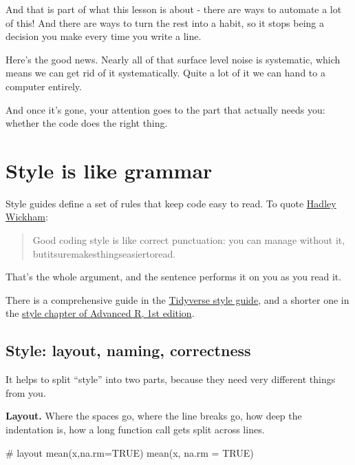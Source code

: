 \documentclass[
  letterpaper,
  justified,
  a4paper]{tufte-book}
\makeatletter
\newenvironment{Shaded}{\begin{snugshade}}{\end{snugshade}}
\newcommand{\AttributeTok}[1]{\textcolor[rgb]{0.40,0.45,0.13}{#1}}
\newcommand{\CommentTok}[1]{\textcolor[rgb]{0.37,0.37,0.37}{#1}}
\newcommand{\ConstantTok}[1]{\textcolor[rgb]{0.56,0.35,0.01}{#1}}
\newcommand{\FunctionTok}[1]{\textcolor[rgb]{0.28,0.35,0.67}{#1}}
\newcommand{\NormalTok}[1]{\textcolor[rgb]{0.00,0.23,0.31}{#1}}
\let\rbporigShaded\Shaded
\let\rbporigendShaded\endShaded
\renewenvironment{Shaded}{%
  \begingroup
  \ifdim\linewidth=\rbpbodywidth
    \advance\linewidth by \@tufte@overhang
    \advance\hsize by \@tufte@overhang
    \advance\columnwidth by \@tufte@overhang
  \fi
  \rbporigShaded
}{%
  \rbporigendShaded
  \endgroup
}
\makeatother
\begin{document}
And that is part of what this lesson is about - there are ways to
automate a lot of this! And there are ways to turn the rest into a
habit, so it stops being a decision you make every time you write a
line.

Here's the good news. Nearly all of that surface level noise is
systematic, which means we can get rid of it systematically. Quite a lot
of it we can hand to a computer entirely.

And once it's gone, your attention goes to the part that actually needs
you: whether the code does the right thing.

\section{Style is like grammar}\label{style-is-like-grammar}

Style guides define a set of rules that keep code easy to read. To quote
\href{https://hadley.nz/}{Hadley Wickham}:

\begin{quote}
Good coding style is like correct punctuation: you can manage without
it, butitsuremakesthingseasiertoread.
\end{quote}

That's the whole argument, and the sentence performs it on you as you
read it.

There is a comprehensive guide in the
\href{https://style.tidyverse.org/}{Tidyverse style guide}, and a
shorter one in the \href{http://adv-r.had.co.nz/Style.html}{style
chapter of Advanced R, 1st edition}.

\subsection{Style: layout, naming,
correctness}\label{style-layout-naming-correctness}

It helps to split ``style'' into two parts, because they need very
different things from you.

\textbf{Layout.} Where the spaces go, where the line breaks go, how deep
the indentation is, how a long function call gets split across lines.

\begin{Shaded}
\begin{Highlighting}[]
\CommentTok{\# layout}
\FunctionTok{mean}\NormalTok{(x,}\AttributeTok{na.rm=}\ConstantTok{TRUE}\NormalTok{)}
\FunctionTok{mean}\NormalTok{(x, }\AttributeTok{na.rm =} \ConstantTok{TRUE}\NormalTok{)}
\end{Highlighting}
\end{Shaded}
\end{document}
